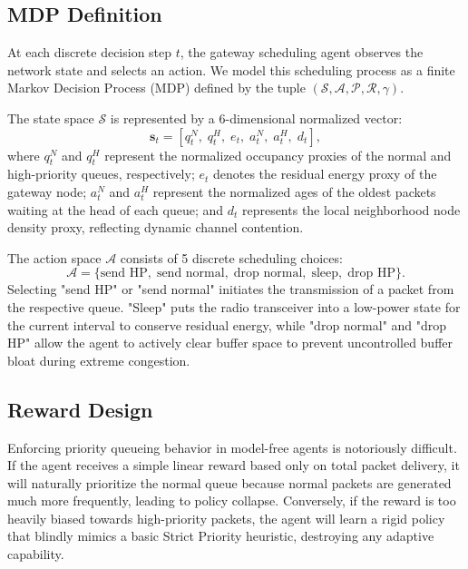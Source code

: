 \documentclass[runningheads,a4paper]{llncs}
\begin{document}
\subsection{MDP Definition}
At each discrete decision step $t$, the gateway scheduling agent observes the network state and selects an action. We model this scheduling process as a finite Markov Decision Process (MDP) defined by the tuple $(\mathcal{S}, \mathcal{A}, \mathcal{P}, \mathcal{R}, \gamma)$.

The state space $\mathcal{S}$ is represented by a 6-dimensional normalized vector:
\begin{equation}
\mathbf{s}_t = [q_t^{N},\; q_t^{H},\; e_t,\; a_t^{N},\; a_t^{H},\; d_t],
\end{equation}
where $q_t^{N}$ and $q_t^{H}$ represent the normalized occupancy proxies of the normal and high-priority queues, respectively; $e_t$ denotes the residual energy proxy of the gateway node; $a_t^{N}$ and $a_t^{H}$ represent the normalized ages of the oldest packets waiting at the head of each queue; and $d_t$ represents the local neighborhood node density proxy, reflecting dynamic channel contention.

The action space $\mathcal{A}$ consists of 5 discrete scheduling choices:
\begin{equation}
\mathcal{A} = \{\text{send HP},\; \text{send normal},\; \text{drop normal},\; \text{sleep},\; \text{drop HP}\}.
\end{equation}
Selecting "send HP" or "send normal" initiates the transmission of a packet from the respective queue. "Sleep" puts the radio transceiver into a low-power state for the current interval to conserve residual energy, while "drop normal" and "drop HP" allow the agent to actively clear buffer space to prevent uncontrolled buffer bloat during extreme congestion.

\subsection{Reward Design}
Enforcing priority queueing behavior in model-free agents is notoriously difficult. If the agent receives a simple linear reward based only on total packet delivery, it will naturally prioritize the normal queue because normal packets are generated much more frequently, leading to policy collapse. Conversely, if the reward is too heavily biased towards high-priority packets, the agent will learn a rigid policy that blindly mimics a basic Strict Priority heuristic, destroying any adaptive capability.
\end{document}
